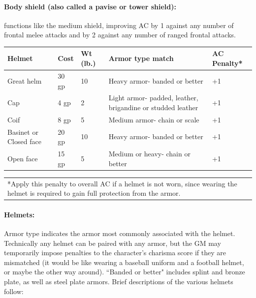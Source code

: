 \begin{multicols}{2}
\paragraph{Body shield (also called a pavise or tower shield):} functions like the medium shield, improving AC by 1 against any number of frontal melee attacks and by 2 against any number of ranged frontal attacks.

\noindent
\begin{minipage}{\columnwidth}

\label{helmets}
\noindent
\begin{tabular}{|p{}|p{}|p{}|p{}|p{}|}
\hline
Helmet		& Cost	& Wt (lb.)	& Armor type match												& AC Penalty* \\
\hline\hline
\rowcolor[gray]{.9}Great helm	& 30 gp		& 10	& Heavy armor- banded or better									& +1 \\
Cap			& 4 gp		& 2		& Light armor- padded, leather, brigandine or studded leather	& +1 \\
\rowcolor[gray]{.9}Coif		& 8 gp		& 5		& Medium armor- chain or scale									& +1 \\
Basinet or Closed face	& 20 gp	& 10	& Heavy armor- banded or better							& +1 \\
\rowcolor[gray]{.9}Open face	& 15 gp		& 5		& Medium or heavy- chain or better								& +1 \\
\hline
\end{tabular}
\noindent\begin{tabular}{p{}}
*Apply this penalty to overall AC if a helmet is not worn, since wearing the helmet is required to gain full protection from the armor. \\
\end{tabular}\vspace{.5em}

\end{minipage}

\paragraph{Helmets:} Armor type indicates the armor most commonly associated with the helmet. Technically any helmet can be paired with any armor, but the GM may temporarily impose penalties to the character's charisma score if they are mismatched (it would be like wearing a baseball uniform and a football helmet, or maybe the other way around).  ``Banded or better" includes splint and bronze plate, as well as steel plate armors.  Brief descriptions of the various helmets follow:


\end{multicols}
